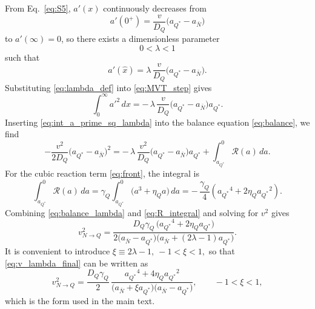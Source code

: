 \documentclass[superscriptaddress,amsmath,floatfix,aps,prc,twocolumn]{revtex4-1}
\newcommand{\aQstar}{\ensuremath{a_{Q^*}}}
\newcommand{\Nbar}{{\ensuremath{\bar N}}}
\begin{document}
From Eq.~\eqref{eq:S5}, $a'(x)$ continuously decreases from
\begin{equation}
    a'(0^+) = \frac{v}{D_Q}\bigl(\aQstar-a_\Nbar\bigr)
\end{equation}
to $a'(\infty)=0$, so there exists a dimensionless parameter
\begin{equation}
    0<\lambda<1
\end{equation}
such that
\begin{equation}
    a'(\hat{x})=\lambda\,\frac{v}{D_Q}\bigl(\aQstar-a_\Nbar\bigr).
    \label{eq:lambda_def}
\end{equation}
Substituting \eqref{eq:lambda_def} into \eqref{eq:MVT_step} gives
\begin{equation}
    \int_{0}^{\infty} a'^2\,dx
    = -\,\lambda\,\frac{v}{D_Q}\bigl(\aQstar-a_\Nbar\bigr) \aQstar.
    \label{eq:int_a_prime_sq_lambda}
\end{equation}
Inserting \eqref{eq:int_a_prime_sq_lambda} into the balance equation
\eqref{eq:balance}, we find
\begin{equation}
    -\frac{v^2}{2D_Q}\bigl(\aQstar-a_\Nbar\bigr)^2
    = -\,\lambda\,\frac{v^2}{D_Q}\bigl(\aQstar-a_\Nbar\bigr)\aQstar
      +\int^{0}_{\aQstar}\mathcal{R}(a)\,da.
    \label{eq:balance_lambda}
\end{equation}
For the cubic reaction term \eqref{eq:front}, the integral is
\begin{equation}
    \int^{0}_{\aQstar}\mathcal{R}(a)\,da
    = \gamma_Q\int_{\aQstar}^{0}\bigl(a^3+\eta_Q a\bigr)\,da
    = -\,\frac{\gamma_Q}{4}\left(\aQstar^4+2\eta_Q \aQstar^2\right).
    \label{eq:R_integral}
\end{equation}
Combining \eqref{eq:balance_lambda} and \eqref{eq:R_integral} and solving for $v^2$
gives
\begin{equation}
    v_{N\to Q}^2
    = \frac{D_Q\gamma_Q\,\bigl(\aQstar^4+2\eta_Q\aQstar\bigr)}
           {2\bigl(a_\Nbar-\aQstar\bigr)\bigl(a_\Nbar+(2\lambda-1)\aQstar\bigr)}.
    \label{eq:v_lambda_final}
\end{equation}
It is convenient to introduce $\xi \equiv 2\lambda-1, \ -1<\xi<1,$ so that \eqref{eq:v_lambda_final} can be written as
\begin{equation}
    v_{N\to Q}^2
    = \frac{D_Q\gamma_Q}{2}\,
      \frac{\aQstar^4+4\eta_Q \aQstar^2}
           {\bigl(a_\Nbar+\xi \aQstar\bigr)\bigl(a_\Nbar-\aQstar\bigr)},
    \qquad -1<\xi<1,
    \label{eq:v_xi_final}
\end{equation}
which is the form used in the main text.
\end{document}
